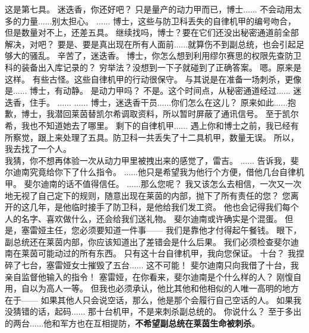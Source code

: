 \documentclass[openany]{book}
\begin{document}
\begin{dialogue}
     这是第七具。
     迷迭香，你还好吧？
     只是量产的动力甲而已，博士......
     不会动用太多的力量......别太担心。
     ......
     博士，这些与防卫科丢失的自律机甲的编号吻合，但是数量对不上，还差五具。
     继续找吗，博士？要在它们还没出秘密通道前全部解决，对吧？
     要是、要是真出现在所有人面前......就算伤不到副总统，也会引起足够大的骚乱。
     辛苦了，迷迭香。
     博士，你怎么想到利用缪尔赛思的权限先查防卫科的装备出入库记录的？
     穷举法？没想到一下子就碰到了正确答案。
     嗯。原来是这样。
     有些古怪。这些自律机甲的行动很保守。
     与其说是在准备一场刺杀，更像是......
     博士，有动静。
     是动力甲吗？
     不是。这个时间点，从秘密通道经过......
     迷迭香，住手。
     ......
     ......
     博士，迷迭香干员......你们怎么在这儿？
     原来如此......抱歉，博士，我潜回莱茵替凯尔希调取资料，所以暂时屏蔽了通讯信号。
     至于凯尔希，我也不知道她去了哪里。
     剩下的自律机甲......
     遇上你和博士之前，我已经有所察觉，跟上来处理了五具。防卫科一共丢失了十二具机甲，数量无误。
     所以，我去找了一个人。
    \\
     我猜，你不想再体验一次从动力甲里被拽出来的感觉了，雷吉。
     ......
     告诉我，斐尔迪南究竟给你下了什么指令。
     ......他只是希望我为他行个方便，借他几台自律机甲。
     斐尔迪南的话不值得信任。
     ......那么您呢？
     我又该怎么去相信，一次又一次地无视了自己定下的规则，随意出现在莱茵的内部，抛下了所有责任的您？
     您离开的这几年，是他临时接手了防卫科，是他给我们发工资。
     他也会记得我们每个人的名字、喜欢做什么，还会给我们送礼物。
     斐尔迪南或许确实是个混蛋。
     但是，塞雷娅主任，您必须要知道一件事——
     我们是靠他才付得起午餐钱。
     眼下，副总统还在莱茵内部，你应该知道出了差错会是什么后果。
     我们必须检查斐尔迪南在莱茵可能动过的所有东西。
     只有这十台自律机甲，我向您保证。
     十台？
     我捏碎了七台，塞雷娅女士摧毁了五台......
     这不可能！
     斐尔迪南只向我借了十台，我亲自监督他输入的指令！
     塞雷娅，在你看来，斐尔迪南是个什么样的人？
     刚愎自用，自以为高人一等。
     但我也必须承认，他比其他和他相似的人唯一高明的地方在于——
     如果其他人只会说空话，那么，他是那个会履行自己空话的人。
     如果我没猜错的话，起码......
     那十台机甲，不是来刺杀副总统的。
     你说什么？
     至于多出的两台......他和军方也在互相提防，\textbf{不希望副总统在莱茵生命被刺杀}。
\end{dialogue}
\end{document}
